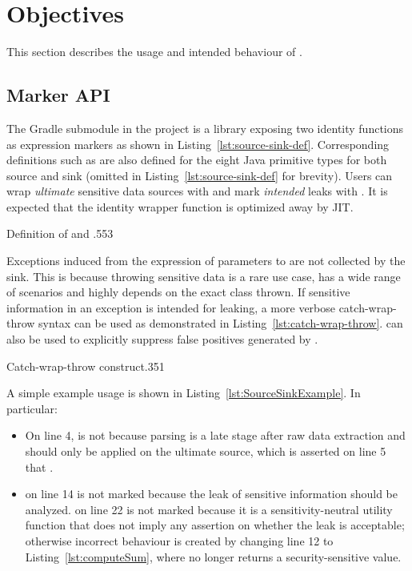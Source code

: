\section{Objectives}\label{sec:objectives}
This section describes the usage and intended behaviour of \pname{}.

\subsection{Marker API}\label{subsec:marker-api}
The  Gradle submodule in the project
is a library exposing two identity functions as expression markers
as shown in Listing~\ref{lst:source-sink-def}.
Corresponding definitions such as 
are also defined for the eight Java primitive types
for both source and sink (omitted in Listing~\ref{lst:source-sink-def} for brevity).
Users can wrap \emph{ultimate} sensitive data sources with 
and mark \emph{intended} leaks with .
It is expected that the identity wrapper function is optimized away by \ac{JIT}.

{Definition of  and }{.55}{3}

Exceptions induced from the expression of parameters to 
are not collected by the sink.
This is because throwing sensitive data is a rare use case,
has a wide range of scenarios
and highly depends on the exact class thrown.
If sensitive information in an exception is intended for leaking,
a more verbose catch-wrap-throw syntax can be used
as demonstrated in Listing~\ref{lst:catch-wrap-throw}.
 can also be used to explicitly suppress false positives generated by \pname{}.

{Catch-wrap-throw construct}{.35}{1}

A simple example usage is shown in Listing~\ref{lst:SourceSinkExample}.
In particular:
\begin{itemize}
  \item On line 4,  is not 
    because parsing is a late stage after raw data extraction
    and  should only be applied on the ultimate source,
    which is asserted on line 5 that .
  \item {} on line 14 is not marked 
    because the leak of sensitive information should be analyzed.
     on line 22 is not marked 
    because it is a sensitivity-neutral utility function
    that does not imply any assertion on whether the leak is acceptable;
    otherwise incorrect behaviour is created by changing line 12 to Listing~\ref{lst:computeSum},
    where  no longer returns a security-sensitive value.
\end{itemize}

